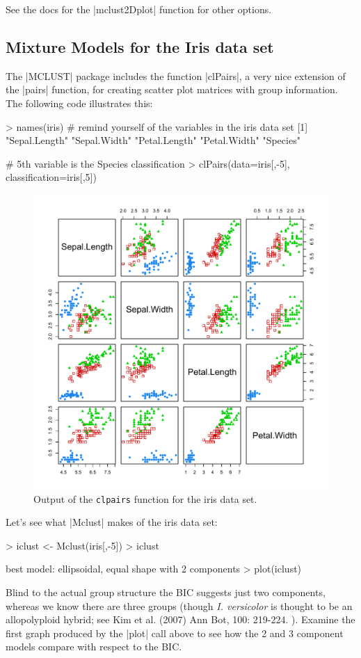See the docs for the |mclust2Dplot| function for other options.

\subsection{Mixture Models for the Iris data set}

The |MCLUST| package includes the function |clPairs|, a very nice extension of the |pairs| function, for creating scatter plot matrices with group information. The following code illustrates this:

\begin{R}
> names(iris) # remind yourself of the variables in the iris data set
[1] "Sepal.Length" "Sepal.Width"  "Petal.Length" "Petal.Width"  "Species"

# 5th variable is the Species classification
> clPairs(data=iris[,-5], classification=iris[,5])
\end{R}

\begin{figure}[!ht]
    \centering
    \includegraphics[width=0.5\columnwidth]{./figures/hands-on10/iris-clpairs.pdf}
    \caption{Output of the \texttt{clpairs} function for the iris data set.}\label{fig:clpairs}
\end{figure}

Let's see what |Mclust| makes of the iris data set:

\begin{R}
> iclust <- Mclust(iris[,-5])
> iclust

 best model: ellipsoidal, equal shape with 2 components
> plot(iclust)
\end{R}

Blind to the actual group structure the BIC suggests just two components, whereas we know there are three groups (though \textit{I. versicolor} is thought to be an allopolyploid hybrid; see Kim et al. (2007) Ann Bot, 100: 219-224. ). Examine the first graph produced by the |plot| call above to see how the 2 and 3 component models compare with respect to the BIC.

